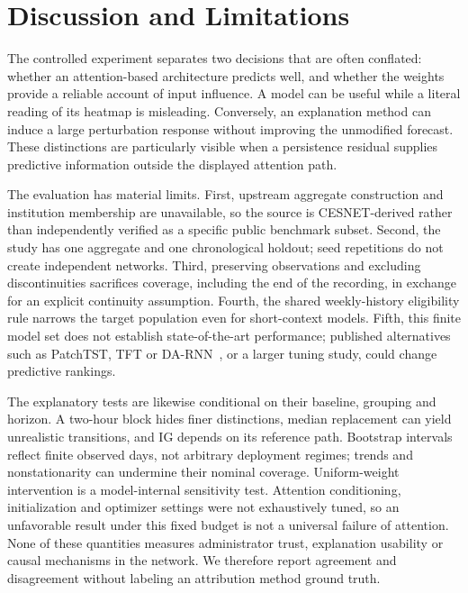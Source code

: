 \documentclass[conference]{IEEEtran}
\begin{document}
\section{Discussion and Limitations}
The controlled experiment separates two decisions that are often conflated: whether an attention-based architecture predicts well, and whether the weights provide a reliable account of input influence. A model can be useful while a literal reading of its heatmap is misleading. Conversely, an explanation method can induce a large perturbation response without improving the unmodified forecast. These distinctions are particularly visible when a persistence residual supplies predictive information outside the displayed attention path.

The evaluation has material limits. First, upstream aggregate construction and institution membership are unavailable, so the source is CESNET-derived rather than independently verified as a specific public benchmark subset. Second, the study has one aggregate and one chronological holdout; seed repetitions do not create independent networks. Third, preserving observations and excluding discontinuities sacrifices coverage, including the end of the recording, in exchange for an explicit continuity assumption. Fourth, the shared weekly-history eligibility rule narrows the target population even for short-context models. Fifth, this finite model set does not establish state-of-the-art performance; published alternatives such as PatchTST, TFT or DA-RNN~\cite{patchtst,tft,darnn}, or a larger tuning study, could change predictive rankings.

The explanatory tests are likewise conditional on their baseline, grouping and horizon. A two-hour block hides finer distinctions, median replacement can yield unrealistic transitions, and IG depends on its reference path. Bootstrap intervals reflect finite observed days, not arbitrary deployment regimes; trends and nonstationarity can undermine their nominal coverage. Uniform-weight intervention is a model-internal sensitivity test. Attention conditioning, initialization and optimizer settings were not exhaustively tuned, so an unfavorable result under this fixed budget is not a universal failure of attention. None of these quantities measures administrator trust, explanation usability or causal mechanisms in the network. We therefore report agreement and disagreement without labeling an attribution method ground truth.
\end{document}
